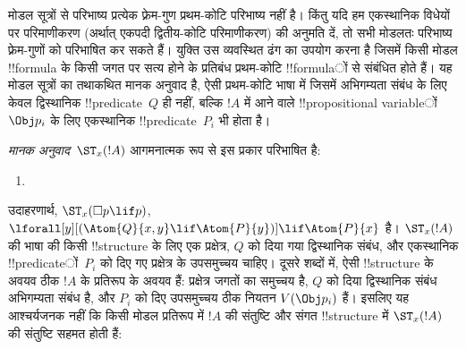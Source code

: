 \documentclass[../../../include/open-logic-section]{subfiles}
\begin{document}


मोडल सूत्रों से परिभाष्य प्रत्येक फ़्रेम-गुण प्रथम-कोटि परिभाष्य नहीं है।
किंतु यदि हम एकस्थानिक विधेयों पर परिमाणीकरण (अर्थात् एकपदी द्वितीय-कोटि
परिमाणीकरण) की अनुमति दें, तो सभी मोडलतः परिभाष्य फ़्रेम-गुणों को परिभाषित
कर सकते हैं। युक्ति उस व्यवस्थित ढंग का उपयोग करना है जिसमें किसी मोडल
!!{formula} के किसी जगत पर सत्य होने के प्रतिबंध प्रथम-कोटि !!{formula}ों से
संबंधित होते हैं। यह मोडल सूत्रों का तथाकथित मानक अनुवाद है, ऐसी प्रथम-कोटि
भाषा में जिसमें अभिगम्यता संबंध के लिए केवल द्विस्थानिक !!{predicate}~$Q$ ही
नहीं, बल्कि $!A$ में आने वाले !!{propositional variable}ों~$\Obj p_i$ के लिए
एकस्थानिक !!{predicate}~$P_i$ भी होता है।

\begin{defn}
  \emph{मानक अनुवाद}~$\ST_x(!A)$ आगमनात्मक रूप से इस प्रकार परिभाषित है:
  \begin{enumerate}
  \item {}
  \end{enumerate}
\end{defn}

उदाहरणार्थ, $\ST_x(\Box p \lif p)$,
$\lforall[y][(\Atom{Q}{x,y} \lif \Atom{P}{y})] \lif \Atom{P}{x}$ है।
$\ST_x(!A)$ की भाषा की किसी !!{structure} के लिए एक प्रक्षेत्र, $Q$ को दिया
गया द्विस्थानिक संबंध, और एकस्थानिक !!{predicate}ों~$P_i$ को दिए गए प्रक्षेत्र
के उपसमुच्चय चाहिए। दूसरे शब्दों में, ऐसी !!{structure} के अवयव ठीक $!A$ के
प्रतिरूप के अवयव हैं: प्रक्षेत्र जगतों का समुच्चय है, $Q$ को दिया द्विस्थानिक
संबंध अभिगम्यता संबंध है, और $P_i$ को दिए उपसमुच्चय ठीक नियतन
$V(\Obj p_i)$ हैं। इसलिए यह आश्चर्यजनक नहीं कि किसी मोडल प्रतिरूप में $!A$
की संतुष्टि और संगत !!{structure} में $\ST_x(!A)$ की संतुष्टि सहमत होती हैं:
\end{document}
